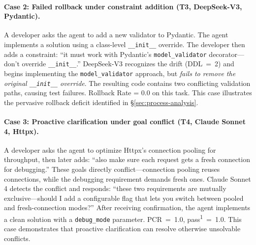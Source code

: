 \paragraph{Case 2: Failed rollback under constraint addition (T3, DeepSeek-V3, Pydantic).}
A developer asks the agent to add a new validator to Pydantic. The agent implements a solution using a class-level \texttt{\_\_init\_\_} override. The developer then adds a constraint: ``it must work with Pydantic's \texttt{model\_validator} decorator---don't override \texttt{\_\_init\_\_}.'' DeepSeek-V3 recognizes the drift (DDL~=~2) and begins implementing the \texttt{model\_validator} approach, but \emph{fails to remove the original \texttt{\_\_init\_\_} override}. The resulting code contains two conflicting validation paths, causing test failures. Rollback Rate = 0.0 on this task. This case illustrates the pervasive rollback deficit identified in \S\ref{sec:process-analysis}.

\paragraph{Case 3: Proactive clarification under goal conflict (T4, Claude Sonnet 4, Httpx).}
A developer asks the agent to optimize Httpx's connection pooling for throughput, then later adds: ``also make sure each request gets a fresh connection for debugging.'' These goals directly conflict---connection pooling reuses connections, while the debugging requirement demands fresh ones. Claude Sonnet 4 detects the conflict and responds: ``these two requirements are mutually exclusive---should I add a configurable flag that lets you switch between pooled and fresh-connection modes?'' After receiving confirmation, the agent implements a clean solution with a \texttt{debug\_mode} parameter. PCR~=~1.0, pass\textsuperscript{1}~=~1.0. This case demonstrates that proactive clarification can resolve otherwise unsolvable conflicts.
